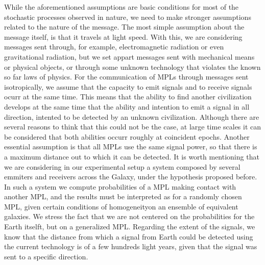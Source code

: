 \documentclass[crop]{CSLB}%
\begin{document}
While the aforementioned assumptions are basic conditions for most of
the stochastic processes observed in nature, we need to make stronger
assumptions related to the nature of the message.
%
The most simple assumption about the message itself, is that it
travels at light speed.
%
With this, we are considering messages sent through, for example,
electromagnetic radiation or even gravitational radiation, but we set
appart messages sent with mechanical means or physical objects, or
through some unknown technology that violates the known so far laws of
physics.
% 
For the communication of MPLs through messages sent isotropically, we
assume that the capacity to emit signals and to receive signals ocurr
at the same time.
%
This means that the ability to find another civilization develops at
the same time that the ability and intention to emit a signal in all
direction, intented to be detected by an unknown civilization.
%
Although there are several reasons to think that this could not be the
case, at large time scales it can be considered that both abilities
occurr roughly at coincident epochs.
%
Another essential assumption is that all MPLs use the same signal
power, so that there is a maximum distance out to which it can be
detected.
%
It is worth mentioning that we are considering in our experimental
setup a system composed by several emmiters and receivers across the
Galaxy, under the hypothesis proposed before.
%
In such a system we compute probabilities of a MPL making contact
with another MPL, and the results must be interpreted as for a
randomly chosen MPL, given certain conditions of homogeneityon an
ensemble of equivalent galaxies.
%
We stress the fact that we are not centered on the probabilities for
the Earth itselft, but on a generalized MPL.
%
Regarding the extent of the signals, we know that the distance from
which a signal from Earth could be detected using the current
technology is of a few hundreds light years, given that the signal was
sent to a specific direction.


   
\end{document}
